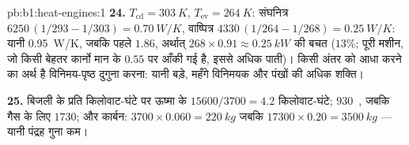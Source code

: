 \begin{solution}{pb:b1:heat-engines:1}
\textbf{24.} $T_{\mathrm{cd}} = \qty{303}{K}$, $T_{\mathrm{ev}} = \qty{264}{K}$:
संघनित्र $6250\,(1/293 - 1/303) = \qty{0.70}{W/K}$, वाष्पित्र
$4330\,(1/264 - 1/268) = \qty{0.25}{W/K}$: यानी \qty{0.95}{W/K}, जबकि पहले
$1.86$, अर्थात् $268 \times 0.91 \approx \qty{0.25}{kW}$ की बचत ($13\%$; पूरी
मशीन, जो किसी बेहतर कार्नो मान के $0.55$ पर आँकी गई है, इससे अधिक पाती)।
किसी अंतर को आधा करने का अर्थ है विनिमय-पृष्ठ दुगुना करना: यानी बड़े,
महँगे विनिमयक और पंखों की अधिक शक्ति।

\textbf{25.} बिजली के प्रति किलोवाट-घंटे पर ऊष्मा के $15600/3700 = 4.2$
किलोवाट-घंटे; $930$~\texteuro, जबकि गैस के लिए $1730$; और कार्बन: $3700
\times 0.060 = \qty{220}{kg}$ जबकि $17300 \times 0.20 = \qty{3500}{kg}$ ---
यानी पंद्रह गुना कम।
\end{solution}
